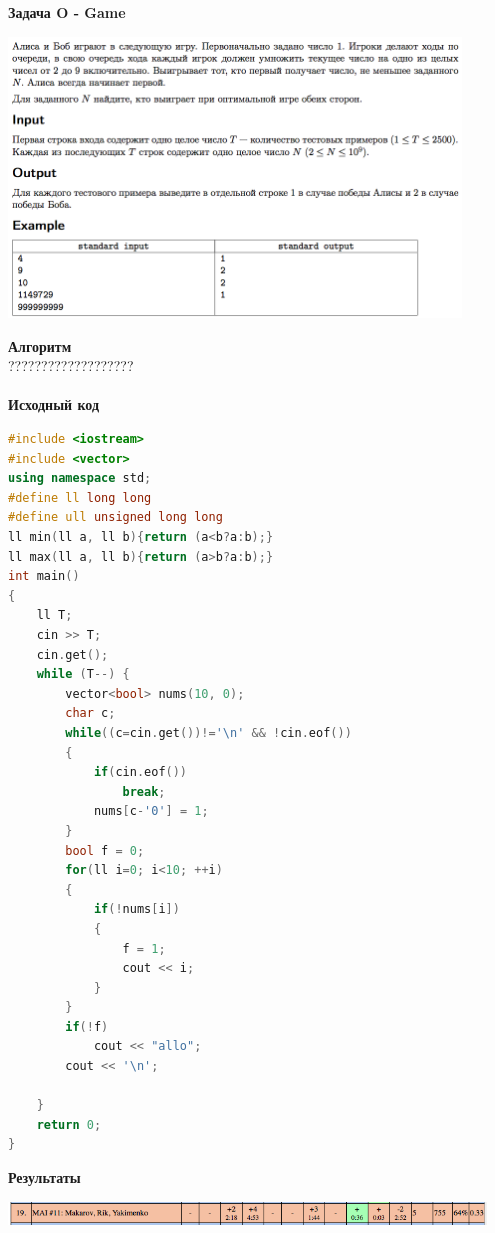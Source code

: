 \documentclass[a4paper,12pt]{article}
\begin{document}
\textbf{{\large Задача O - Game}} \\
\begin{center}
\includegraphics[width=0.9\textwidth]{OC_Europe/OC_Europe_O.png}\\ [1cm]
\end{center}
\newpage

\textbf{{\large Алгоритм}} \\
{\Huge ???????????????????} \\ 
\\
\textbf{{\large Исходный код}}
\begin{lstlisting}[language=C++]
#include <iostream>
#include <vector>
using namespace std;
#define ll long long
#define ull unsigned long long
ll min(ll a, ll b){return (a<b?a:b);}
ll max(ll a, ll b){return (a>b?a:b);}
int main()
{
    ll T;
    cin >> T;
    cin.get();
    while (T--) {
        vector<bool> nums(10, 0);
        char c;
        while((c=cin.get())!='\n' && !cin.eof())
        {
            if(cin.eof())
                break;
            nums[c-'0'] = 1;
        }
        bool f = 0;
        for(ll i=0; i<10; ++i)
        {
            if(!nums[i])
            {
                f = 1;
                cout << i;
            }
        }
        if(!f)
            cout << "allo";
        cout << '\n';
            
    }
    return 0;
}
\end{lstlisting}

\textbf{{\large Результаты}} \\
\begin{center}
\includegraphics[width=0.95\textwidth]{OC_Europe/OC_Europe_result.png}\\ [1cm]
\end{center}
\end{document}
